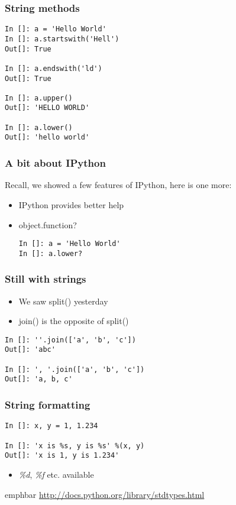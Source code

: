 \documentclass[14pt,compress]{beamer}
\newcommand{\emphbar}[1]
{\begin{beamercolorbox}[rounded=true]{emphbar} 
      {#1}
 \end{beamercolorbox}
}
\newcounter{time}
\newcommand{\inctime}[1]{\addtocounter{time}{#1}{\tiny \thetime\ m}}
\begin{document}
\begin{frame}[fragile]
  \frametitle{String methods}
  \begin{lstlisting}
In []: a = 'Hello World'
In []: a.startswith('Hell')
Out[]: True

In []: a.endswith('ld')
Out[]: True

In []: a.upper()
Out[]: 'HELLO WORLD'

In []: a.lower()
Out[]: 'hello world'
  \end{lstlisting}
\end{frame}

\begin{frame}[fragile]
  \frametitle{A bit about IPython}
  Recall, we showed a few features of IPython, here is one more:
  \begin{itemize}
    \item IPython provides better help
    \item object.function?
    \begin{lstlisting}
In []: a = 'Hello World'
In []: a.lower?
    \end{lstlisting}
  \end{itemize}
\end{frame}

\begin{frame}[fragile]
  \frametitle{Still with strings}
  \begin{itemize}
    \item We saw split() yesterday
    \item join() is the opposite of split()
  \end{itemize}
  \begin{lstlisting}
In []: ''.join(['a', 'b', 'c'])
Out[]: 'abc'

In []: ', '.join(['a', 'b', 'c'])
Out[]: 'a, b, c'
  \end{lstlisting}
\end{frame}

\begin{frame}[fragile]
\frametitle{String formatting}
  \begin{lstlisting}
In []: x, y = 1, 1.234

In []: 'x is %s, y is %s' %(x, y)
Out[]: 'x is 1, y is 1.234'
  \end{lstlisting}
  \begin{itemize}
    \item \emph{\%d}, \emph{\%f} etc. available
  \end{itemize}
  \emphbar{\url{http://docs.python.org/library/stdtypes.html}}
  \inctime{10}
\end{frame}
\end{document}
